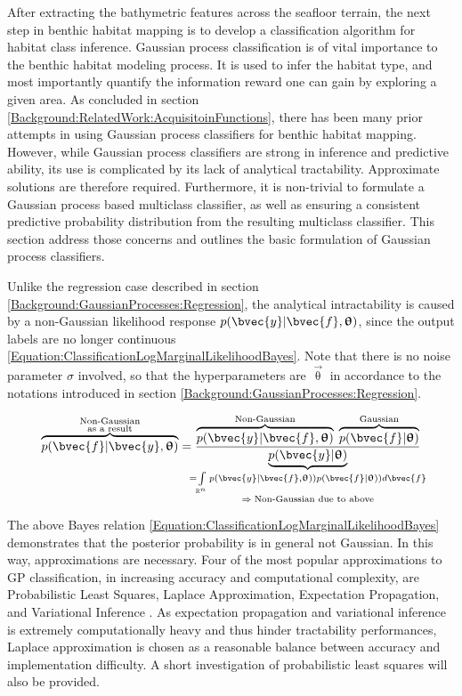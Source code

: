 		After extracting the bathymetric features across the seafloor terrain, the next step in benthic habitat mapping is to develop a classification algorithm for habitat class inference. Gaussian process classification is of vital importance to the benthic habitat modeling process. It is used to infer the habitat type, and most importantly quantify the information reward one can gain by exploring a given area. As concluded in section \ref{Background:RelatedWork:AcquisitoinFunctions}, there has been many prior attempts in using Gaussian process classifiers for benthic habitat mapping. However, while Gaussian process classifiers are strong in inference and predictive ability, its use is complicated by its lack of analytical tractability. Approximate solutions are therefore required. Furthermore, it is non-trivial to formulate a Gaussian process based multiclass classifier, as well as ensuring a consistent predictive probability distribution from the resulting multiclass classifier. This section address those concerns and outlines the basic formulation of Gaussian process classifiers.
		
		Unlike the regression case described in section \ref{Background:GaussianProcesses:Regression}, the analytical intractability is caused by a non-Gaussian likelihood response $p(\bvec{y} | \bvec{f}, \vec{\uptheta})$, since the output labels are no longer continuous \eqref{Equation:ClassificationLogMarginalLikelihoodBayes}. Note that there is no noise parameter $\sigma$ involved, so that the hyperparameters are $\vec{\uptheta}$ in accordance to the notations introduced in section \ref{Background:GaussianProcesses:Regression}.

		\begin{equation}
			\overbrace{p(\bvec{f} | \bvec{y}, \vec{\uptheta})}^{\mathclap{\substack{\text{Non-Gaussian} \\ \text{as a result}}}} = \frac{\overbrace{p(\bvec{y} | \bvec{f}, \vec{\uptheta})}^{\text{Non-Gaussian}} \; \overbrace{p(\bvec{f} | \vec{\uptheta})}^{\text{Gaussian}}}{\underbrace{p(\bvec{y} | \vec{\uptheta})}_{\mathclap{\substack{= \int\limits_{\mathbb{R}^{n}} p(\bvec{y} | \bvec{f}, \vec{\uptheta})) p(\bvec{f} | \vec{\uptheta})) d\bvec{f} \\ \Rightarrow \; \text{Non-Gaussian due to above}}}}}
		\label{Equation:ClassificationLogMarginalLikelihoodBayes}
		\end{equation}

		The above Bayes relation \eqref{Equation:ClassificationLogMarginalLikelihoodBayes} demonstrates that the posterior probability is in general not Gaussian. In this way, approximations are necessary. Four of the most popular approximations to GP classification, in increasing accuracy and computational complexity, are Probabilistic Least Squares, Laplace Approximation, Expectation Propagation, and Variational Inference \citep{GaussianProcessForMachineLearning}. As expectation propagation and variational inference is extremely computationally heavy and thus hinder tractability performances, Laplace approximation is chosen as a reasonable balance between accuracy and implementation difficulty. A short investigation of probabilistic least squares will also be provided.
		
